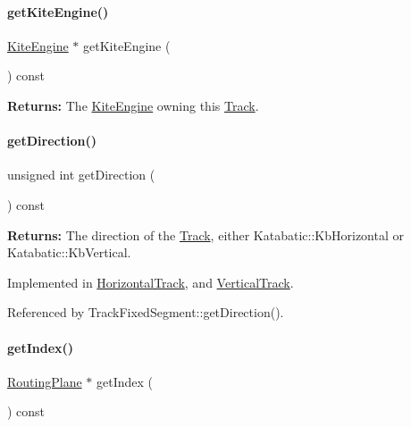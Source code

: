 \paragraph{\texorpdfstring{get\+Kite\+Engine()}{getKiteEngine()}}
{\footnotesize\ttfamily \hyperlink{classKite_1_1KiteEngine}{Kite\+Engine} $\ast$ get\+Kite\+Engine (\begin{DoxyParamCaption}{ }\end{DoxyParamCaption}) const}

{\bfseries Returns\+:} The \hyperlink{classKite_1_1KiteEngine}{Kite\+Engine} owning this \hyperlink{classKite_1_1Track}{Track}. \mbox{\label{classKite_1_1Track_ae35b78590ed6aa546b626ef95f28c533}} 
\paragraph{\texorpdfstring{get\+Direction()}{getDirection()}}
{\footnotesize\ttfamily unsigned int get\+Direction (\begin{DoxyParamCaption}{ }\end{DoxyParamCaption}) const\hspace{0.3cm}{\ttfamily [pure virtual]}}

{\bfseries Returns\+:} The direction of the \hyperlink{classKite_1_1Track}{Track}, either Katabatic\+::\+Kb\+Horizontal or Katabatic\+::\+Kb\+Vertical. 

Implemented in \hyperlink{classKite_1_1HorizontalTrack_a0dd7cf705ace42c662c289955313b2e9}{Horizontal\+Track}, and \hyperlink{classKite_1_1VerticalTrack_a0dd7cf705ace42c662c289955313b2e9}{Vertical\+Track}.



Referenced by Track\+Fixed\+Segment\+::get\+Direction().

\mbox{\label{classKite_1_1Track_ac6f0fd2129f44fe6c0c6eaca9766e1a3}} 
\paragraph{\texorpdfstring{get\+Index()}{getIndex()}}
{\footnotesize\ttfamily \hyperlink{classKite_1_1RoutingPlane}{Routing\+Plane} $\ast$ get\+Index (\begin{DoxyParamCaption}{ }\end{DoxyParamCaption}) const\hspace{0.3cm}{\ttfamily [inline]}}

